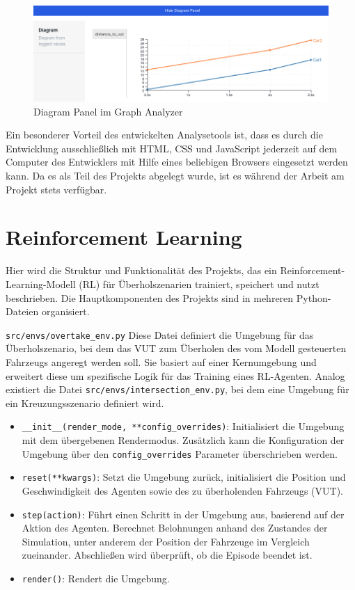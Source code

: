 \begin{figure}[htb]
    \centering
    \includegraphics[width=\textwidth]{contents/figures/diagram_panel.png}
    \caption{Diagram Panel im Graph Analyzer}
    \label{fig:analyzer_diagram_panel}
\end{figure}

Ein besonderer Vorteil des entwickelten Analysetools ist, dass es durch die Entwicklung ausschließlich mit HTML, CSS und JavaScript jederzeit auf dem Computer des Entwicklers mit Hilfe eines beliebigen Browsers eingesetzt werden kann. Da es als Teil des Projekts abgelegt wurde, ist es während der Arbeit am Projekt stets verfügbar.



\section{Reinforcement Learning}
Hier wird die Struktur und Funktionalität des Projekts, das ein Reinforcement-Learning-Modell (RL) für Überholszenarien trainiert, speichert und nutzt beschrieben. Die Hauptkomponenten des Projekts sind in mehreren Python-Dateien organisiert.

\texttt{src/envs/overtake\_env.py}
Diese Datei definiert die Umgebung für das Überholszenario, bei dem das VUT zum Überholen des vom Modell gesteuerten Fahrzeugs angeregt werden soll. Sie basiert auf einer Kernumgebung und erweitert diese um spezifische Logik für das Training eines RL-Agenten.
Analog existiert die Datei \texttt{src/envs/intersection\_env.py}, bei dem eine Umgebung für ein Kreuzungsszenario definiert wird.

\begin{itemize}
    \item \texttt{\_\_init\_\_(render\_mode, **config\_overrides)}: Initialisiert die Umgebung mit dem übergebenen Rendermodus. Zusätzlich kann die Konfiguration der Umgebung über den \texttt{config\_overrides} Parameter überschrieben werden.
    \item \texttt{reset(**kwargs)}: Setzt die Umgebung zurück, initialisiert die Position und Geschwindigkeit des Agenten sowie des zu überholenden Fahrzeugs (VUT).
    \item \texttt{step(action)}: Führt einen Schritt in der Umgebung aus, basierend auf der Aktion des Agenten. Berechnet Belohnungen anhand des Zustandes der Simulation, unter anderem der Position der Fahrzeuge im Vergleich zueinander. Abschließen wird überprüft, ob die Episode beendet ist. 
    \item \texttt{render()}: Rendert die Umgebung.
\end{itemize}


